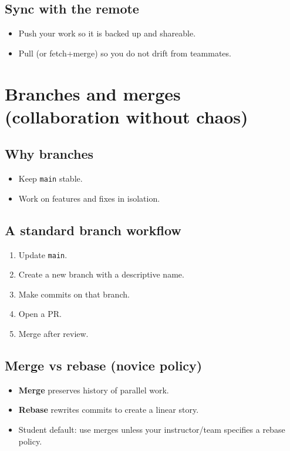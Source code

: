 \subsection{Sync with the remote}
\begin{itemize}
\item Push your work so it is backed up and shareable.
\item Pull (or fetch+merge) so you do not drift from teammates.
\end{itemize}

\section{Branches and merges (collaboration without chaos)}
\subsection{Why branches}
\begin{itemize}
\item Keep \texttt{main} stable.
\item Work on features and fixes in isolation.
\end{itemize}

\subsection{A standard branch workflow}
\begin{enumerate}
\item Update \texttt{main}.
\item Create a new branch with a descriptive name.
\item Make commits on that branch.
\item Open a PR.
\item Merge after review.
\end{enumerate}

\subsection{Merge vs rebase (novice policy)}
\begin{itemize}
\item \textbf{Merge} preserves history of parallel work.
\item \textbf{Rebase} rewrites commits to create a linear story.
\item Student default: use merges unless your instructor/team specifies a rebase policy.
\end{itemize}


